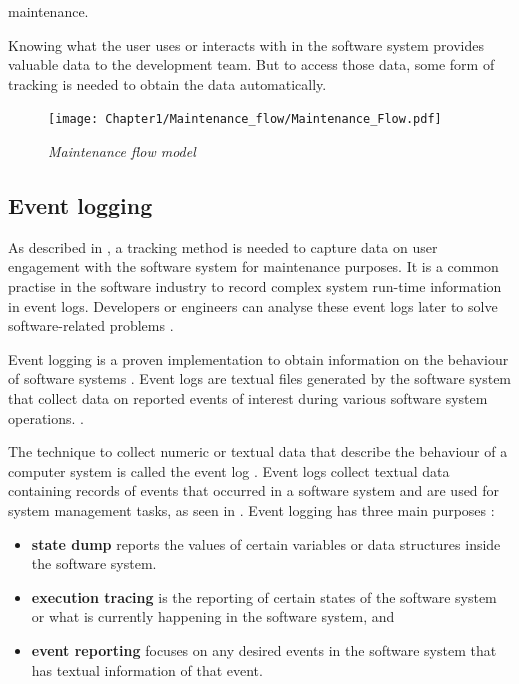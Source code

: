 maintenance.\par Knowing what the user uses or interacts with in the software system provides valuable data to the development team. But to access those data, some form of tracking is needed to obtain the data automatically.

\begin{figure}[!htb]
	\centering %
	\texttt{[image: Chapter1/Maintenance\_flow/Maintenance\_Flow.pdf]}
	\caption[Maintenance flow model]
	{\textit{Maintenance flow model \cite{Tang2010}}} \label{fig:ch1_maintenanceFlow}
\end{figure}

\clearpage

\subsection{Event logging}\label{sec:ch1_eventLogging}
As described in , a tracking method is needed to capture data on user engagement with the software system for maintenance purposes. It is a common practise in the software industry to record complex system run-time information in event logs. Developers or engineers can analyse these event logs later to solve software-related problems \cite{Zhu2019}. \par Event logging is a proven implementation to obtain information on the behaviour of software systems \cite{Baccanico2014}. Event logs are textual files generated by the software system that collect data on reported events of interest during various software system operations. \cite{Cinque2013, Baccanico2014}.\par The technique to collect numeric or textual data that describe the behaviour of a computer system is called the event log \cite{Pecchia2015, Baccanico2014}. Event logs collect textual data containing records of events that occurred in a software system and are used for system management tasks, as seen in  \cite{Rong2018a, Rong2018, Baccanico2014}. Event logging has three main purposes \cite{Pecchia2015, Baccanico2014}:

\begin{itemize}
	\item \textbf{state dump} reports the values of certain variables or data structures inside the software system.
	\item \textbf{execution tracing} is the reporting of certain states of the software system or what is currently happening in the software system, and
	\item \textbf{event reporting} focuses on any desired events in the software system that has textual information of that event.
\end{itemize}

